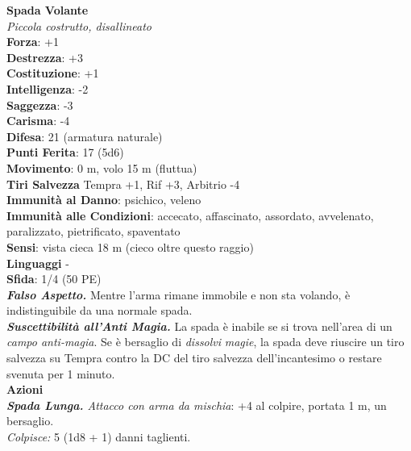 \begin{multicols}{2}
\medskip\textbf{Spada Volante}\\
\emph{Piccola costrutto, disallineato}\\
\textbf{Forza}: +1\\
\textbf{Destrezza}: +3\\
\textbf{Costituzione}: +1\\
\textbf{Intelligenza}: -2\\
\textbf{Saggezza}: -3\\
\textbf{Carisma}: -4\\
\textbf{Difesa}: 21 (armatura naturale)\\
\textbf{Punti Ferita}: 17 (5d6)\\
\textbf{Movimento}: 0 m, volo 15 m (fluttua)\\
\textbf{Tiri Salvezza}  Tempra +1, Rif +3, Arbitrio -4\\
\textbf{Immunità al Danno}: psichico, veleno\\
\textbf{Immunità alle Condizioni}: accecato, affascinato, assordato, avvelenato, paralizzato, pietrificato, spaventato\\
\textbf{Sensi}: vista cieca 18 m (cieco oltre questo raggio)\\
\textbf{Linguaggi} -\\
\textbf{Sfida}: 1/4 (50 PE)\smallskip\\
\emph{\textbf{Falso Aspetto.}} Mentre l'arma rimane immobile e non sta volando, è indistinguibile da una normale spada.\\
\emph{\textbf{Suscettibilità all'Anti Magia.}} La spada è inabile se si trova nell'area di un \emph{campo anti-magia}. Se è bersaglio di \emph{dissolvi} \emph{magie}, la spada deve riuscire un tiro salvezza su Tempra contro la DC del tiro salvezza dell'incantesimo o restare svenuta per 1 minuto.\\
\smallskip\textbf{Azioni}\\
\emph{\textbf{Spada Lunga.} Attacco con arma da mischia}: +4 al colpire, portata 1 m, un bersaglio.\\
\emph{Colpisce:} 5 (1d8 + 1) danni taglienti.\\


\end{multicols}
